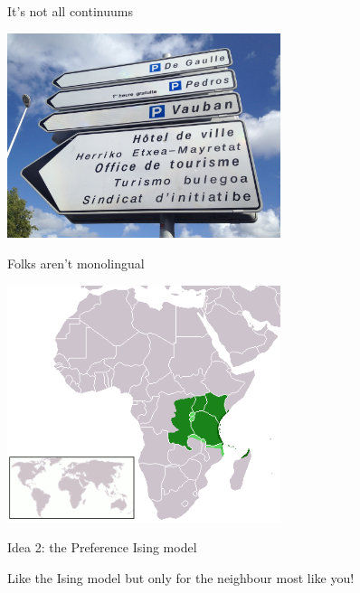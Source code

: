 \documentclass{beamer}
\begin{document}
\begin{frame}{It's not all continuums}
  \begin{minipage}[t][.7\textheight]{\textwidth}
    \vskip 1cm
    \begin{center}
      \includegraphics[width=0.6\textwidth]{basque_sign.jpeg}
    \end{center}
\end{minipage}
\vfill
\color{gray}
\color{black}
\end{frame}


\begin{frame}{Folks aren't monolingual}
  \begin{minipage}[t][.7\textheight]{\textwidth}
    \vskip 1cm
    \begin{center}
      \includegraphics[width=0.6\textwidth]{kiswahili.png}
    \end{center}
\end{minipage}
\vfill
\color{gray}
\color{black}
\end{frame}


\begin{frame}{Idea 2: the Preference Ising model}
  \begin{minipage}[t][.7\textheight]{\textwidth}
    \vskip 1cm
Like the Ising model but only for the neighbour most like you!
\end{minipage}
\end{frame}
\end{document}
